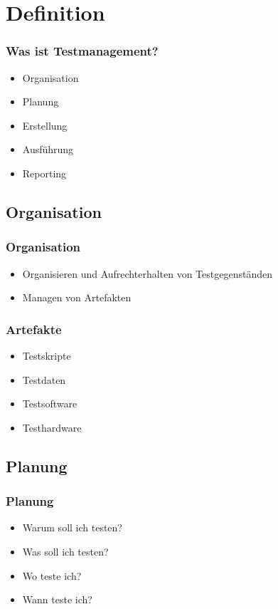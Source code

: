 \section{Definition}
\begin{frame}
	\frametitle{Was ist Testmanagement?}
	\begin{itemize}
		\item Organisation
		\item Planung
		\item Erstellung
		\item Ausf\"uhrung
		\item Reporting
	\end{itemize}
\end{frame}

\subsection{Organisation}
\begin{frame}
	\frametitle{Organisation}
	\begin{itemize}
		\item Organisieren und Aufrechterhalten von Testgegenst\"anden
		\item Managen von Artefakten
	\end{itemize}
\end{frame}

\begin{frame}
	\frametitle{Artefakte}
	\begin{itemize}
		\item Testskripte
		\item Testdaten
		\item Testsoftware
		\item Testhardware
	\end{itemize}
\end{frame}

\subsection{Planung}
\begin{frame}
	\frametitle{Planung}
	\begin{itemize}
		\item Warum soll ich testen?
		\item Was soll ich testen?
		\item Wo teste ich?
		\item Wann teste ich?
	\end{itemize}
\end{frame}

